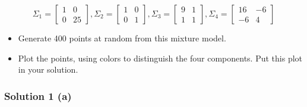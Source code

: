 \documentclass{article}
\begin{document}
$$\Sigma_1 = \begin{bmatrix}1 & 0 \\ 0 & 25\end{bmatrix}, \Sigma_2 = \begin{bmatrix}1 & 0 \\ 0 & 1\end{bmatrix}, \Sigma_3 = \begin{bmatrix}9 & 1 \\ 1 & 1\end{bmatrix}, \Sigma_4 = \begin{bmatrix}16 & -6 \\ -6 & 4\end{bmatrix}$$
\begin{itemize}
    \item Generate 400 points at random from this mixture model.
    \item Plot the points, using colors to distinguish the four components. Put this plot in your solution.
\end{itemize}
\subsubsection*{Solution 1 (a)}
\end{document}

